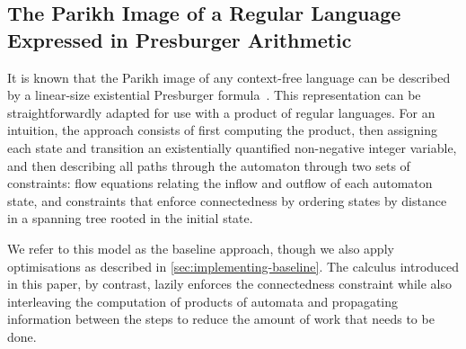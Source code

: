 \subsection{The Parikh Image of a Regular Language Expressed in Presburger Arithmetic}
\label{sec:verma}

It is known that the Parikh image of any context-free language can be
described by a linear-size existential Presburger
formula~\cite{generate-parikh-image}. This representation can be
straightforwardly adapted for use with a product of regular
languages. For an intuition, the approach consists of first computing
the product, then assigning each state and transition an existentially
quantified non-negative integer variable, and then describing all
paths through the automaton through two sets of constraints: flow
equations relating the inflow and outflow of each automaton state, and
constraints that enforce connectedness by ordering states by distance
in a spanning tree rooted in the initial state.

We refer to this model as the baseline approach, though we also apply
optimisations as described in \cref{sec:implementing-baseline}. The calculus
introduced in this paper, by contrast, lazily enforces the connectedness
constraint while also interleaving the computation of products of automata and
propagating information between the steps to reduce the amount of work that
needs to be done.

